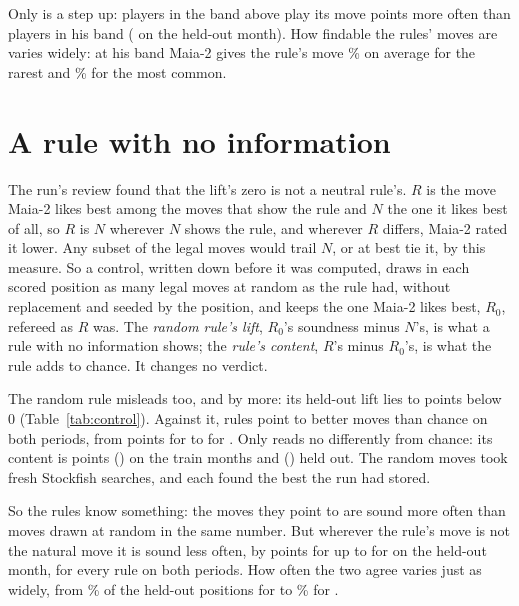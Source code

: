 \documentclass[11pt]{article}
\begin{document}
Only \StepUpName{} is a step up: players in the band above play its move \StepUpGap{} points more
often than players in his band (\StepUpGapCi{} on the held-out month). How findable the rules' moves
are varies widely: at his band Maia-2 gives the rule's move \FindLow\% on average for the rarest and
\FindHigh\% for the most common.

\VerdictTable

\section{A rule with no information}

The run's review found that the lift's zero is not a neutral rule's. $R$ is the move Maia-2 likes
best among the moves that show the rule and $N$ the one it likes best of all, so $R$ is $N$ wherever
$N$ shows the rule, and wherever $R$ differs, Maia-2 rated it lower. Any subset of the legal moves
would trail $N$, or at best tie it, by this measure. So a control, written down before it was computed, draws in each
scored position as many legal moves at random as the rule had, without replacement and seeded by
the position, and keeps the one Maia-2 likes best, $R_0$, refereed as $R$ was. The \emph{random
rule's lift}, $R_0$'s soundness minus $N$'s, is what a rule with no information shows; the
\emph{rule's content}, $R$'s minus $R_0$'s, is what the rule adds to chance. It changes no verdict.

The random rule misleads too, and by more: its held-out lift lies \NullLow{} to \NullHigh{} points
below 0 (Table~\ref{tab:control}). Against it, \NBetter{} rules point to better moves than chance on
both periods, from \ContentLow{} points for \ContentLowName{} to \ContentHigh{} for
\ContentHighName. Only \NoDiffName{} reads no differently from chance: its content is
\NoDiffContentTrain{} points (\NoDiffContentTrainCi) on the train months and \NoDiffContent{}
(\NoDiffContentCi) held out. The random moves took \FreshSearches{} fresh Stockfish searches, and
each found the best the run had stored.

So the rules know something: the moves they point to are sound more often than moves drawn at
random in the same number. But wherever the rule's move is not the natural move it is sound less
often, by \CondLow{} points for \CondLowName{} up to \CondHigh{} for \CondHighName{} on the held-out
month, for every rule on both periods. How often the two agree varies just as widely, from \SameLow\%
of the held-out positions for \SameLowName{} to \SameHigh\% for \SameHighName.
\end{document}
